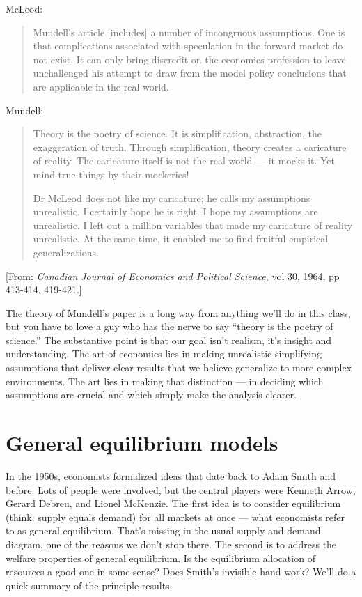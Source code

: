 \documentclass[11pt]{article}
\begin{document}
McLeod:
\begin{quote}
Mundell's article [includes] a number of incongruous assumptions.
One is that complications associated with speculation in the forward market do not exist.
It can only bring discredit on the economics profession to leave unchallenged
his attempt to draw from the model policy conclusions that are applicable in the real world.
\end{quote}
Mundell:
\begin{quote}
Theory is the poetry of science.
It is simplification, abstraction, the exaggeration of truth.
Through simplification, theory creates a caricature of reality.
The caricature itself is not the real world --- it mocks it.
Yet mind true things by their mockeries!

Dr McLeod does not like my caricature; he calls my assumptions unrealistic.
I certainly hope he is right.  I hope my assumptions are unrealistic.
I left out a million variables that made my caricature of reality unrealistic.
At the same time, it enabled me to find fruitful empirical generalizations.
\end{quote}
%
[From:  {\it Canadian Journal of Economics and Political Science\/}, vol 30, 1964, pp 413-414, 419-421.]

The theory of Mundell's paper is a long way from anything
we'll do in this class,
but you have to love a guy who has the nerve to say
``theory is the poetry of science.''
The substantive point is that our goal isn't realism, it's insight and understanding.
The art of economics lies in making unrealistic simplifying assumptions that
deliver clear results that we believe generalize to more complex environments.
The art lies in making that distinction ---
in deciding which assumptions are crucial and
which simply make the analysis clearer.


\section{General equilibrium models}

In the 1950s, economists formalized ideas that date back to Adam Smith and before.
Lots of people were involved, but the central players
were Kenneth Arrow, Gerard Debreu, and Lionel McKenzie.
The first idea is to consider equilibrium (think: supply equals demand)
for all markets at once ---
what economists refer to as general equilibrium.
That's missing in the usual supply and demand diagram,
one of the reasons we don't stop there.
The second is to address the welfare properties of general equilibrium.
Is the equilibrium allocation of resources a good one in some sense?
Does Smith's invisible hand work?
We'll do a quick summary of the principle results.
\end{document}
